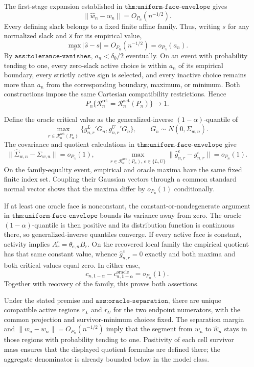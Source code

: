 The first-stage expansion established in \(\texttt{thm:uniform-face-envelope}\) gives
\[
 \lVert\widehat w_n-w_n\rVert=O_{P_n}(n^{-1/2}).
\]
Every defining slack belongs to a fixed finite affine family. Thus, writing \(s\) for any normalized slack and \(\widehat s\) for its empirical value,
\[
 \max_s|\widehat s-s|=O_{P_n}(n^{-1/2})=o_{P_n}(a_n).
\]
By \(\texttt{ass:tolerance-vanishes}\), \(a_n<\delta_0/2\) eventually. On an event with probability tending to one, every zero-slack active choice is within \(a_n\) of its empirical boundary, every strictly active sign is selected, and every inactive choice remains more than \(a_n\) from the corresponding boundary, maximum, or minimum. Both constructions impose the same Cartesian compatibility restrictions. Hence
\[
 P_n\{\mathcal R_n^{\mathrm{ret}}=\mathcal R_n^{\mathrm{act}}(P_n)\}
 \longrightarrow1.
\]

Define the oracle critical value as the generalized-inverse \((1-\alpha)\)-quantile of
\[
 \max_{r\in\mathcal R_n^{\mathrm{act}}(P_n)}
 \{g^L_{n,r}{}'G_n,g^U_{n,r}{}'G_n\},
 \qquad G_n\sim N(0,\Sigma_{w,n}).
\]
The covariance and quotient calculations in \(\texttt{thm:uniform-face-envelope}\) give
\[
 \lVert\widehat\Sigma_{w,n}-\Sigma_{w,n}\rVert=o_{P_n}(1),
 \qquad
 \max_{r\in\mathcal R_n^{\mathrm{act}}(P_n),\,e\in\{L,U\}}
 \lVert\widehat g^e_{n,r}-g^e_{n,r}\rVert=o_{P_n}(1).
\]
On the family-equality event, empirical and oracle maxima have the same fixed finite index set. Coupling their Gaussian vectors through a common standard normal vector shows that the maxima differ by \(o_{P_n}(1)\) conditionally.

If at least one oracle face is nonconstant, the constant-or-nondegenerate argument in \(\texttt{thm:uniform-face-envelope}\) bounds its variance away from zero. The oracle \((1-\alpha)\)-quantile is then positive and its distribution function is continuous there, so generalized-inverse quantiles converge. If every active face is constant, activity implies \(A_r^e=\theta_{e,n}B_r\). On the recovered local family the empirical quotient has that same constant value, whence \(\widehat g^e_{n,r}=0\) exactly and both maxima and both critical values equal zero. In either case,
\[
 c_{n,1-\alpha}-c^{\mathrm{oracle}}_{n,1-\alpha}=o_{P_n}(1).
\]
Together with recovery of the family, this proves both assertions.

Under the stated premise and \(\texttt{ass:oracle-separation}\), there are unique compatible active regions \(r_L\) and \(r_U\) for the two endpoint numerators, with the common projection and survivor-minimum choices fixed. The separation margin and
\(\lVert\widehat w_n-w_n\rVert=O_{P_n}(n^{-1/2})\) imply that the segment from \(w_n\) to \(\widehat w_n\) stays in those regions with probability tending to one. Positivity of each cell survivor mass ensures that the displayed quotient formulas are defined there; the aggregate denominator is already bounded below in the model class.

